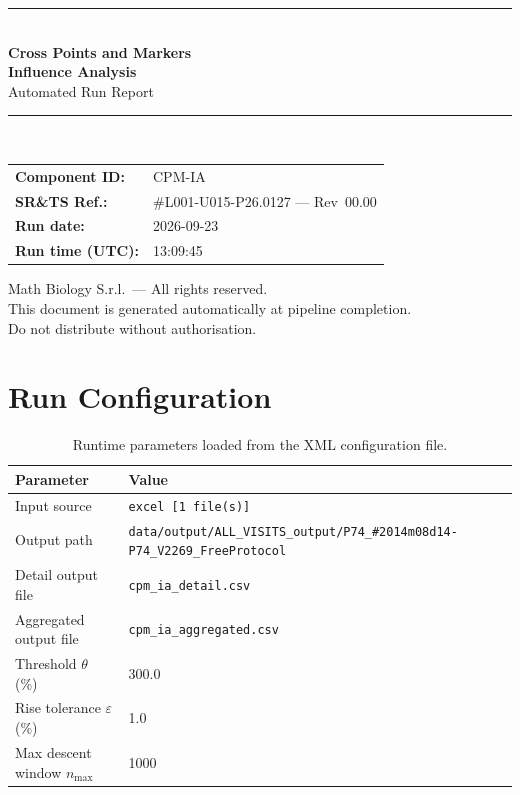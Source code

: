 \documentclass[a4paper,11pt]{article}
\begin{document}
\begin{titlepage}
\begin{center}
  \vspace*{1.8cm}
  {\color{dmaaccent}\rule{\linewidth}{1.5pt}}\\[0.6cm]
  {\LARGE\bfseries\color{dmaaccent}
    Cross Points and Markers\\[0.25cm]
    Influence Analysis}\\[0.4cm]
  {\Large Automated Run Report}\\[0.3cm]
  {\color{dmaaccent}\rule{\linewidth}{1.5pt}}\\[2cm]

  \begin{tabular}{ll}
    \textbf{Component ID:}   & CPM-IA \\[0.3cm]
    \textbf{SR\&TS Ref.:}    & \#L001-U015-P26.0127 --- Rev~00.00 \\[0.3cm]
    \textbf{Run date:}       & 2026-09-23 \\[0.3cm]
    \textbf{Run time (UTC):} & 13:09:45 \\
  \end{tabular}

  \vfill
  {\color{dmagray}\small
    Math Biology S.r.l.\ --- All rights reserved.\\
    This document is generated automatically at pipeline completion.\\
    Do not distribute without authorisation.}
\end{center}
\end{titlepage}

\tableofcontents
\clearpage

\section{Run Configuration}

\begin{table}[h!]
\centering
\small
\caption{Runtime parameters loaded from the XML configuration file.}
\begin{tabular}{ll}
\toprule
\textbf{Parameter} & \textbf{Value} \\
\midrule
Input source                      & \texttt{excel [1 file(s)]} \\
Output path                       & \texttt{data/output/ALL\_VISITS\_output/P74\_\#2014m08d14-P74\_V2269\_FreeProtocol} \\
Detail output file                & \texttt{cpm\_ia\_detail.csv} \\
Aggregated output file            & \texttt{cpm\_ia\_aggregated.csv} \\
Threshold $\theta$ (\%)           & 300.0 \\
Rise tolerance $\varepsilon$ (\%) & 1.0 \\
Max descent window $n_{\max}$     & 1000 \\
\bottomrule
\end{tabular}
\end{table}
\end{document}
